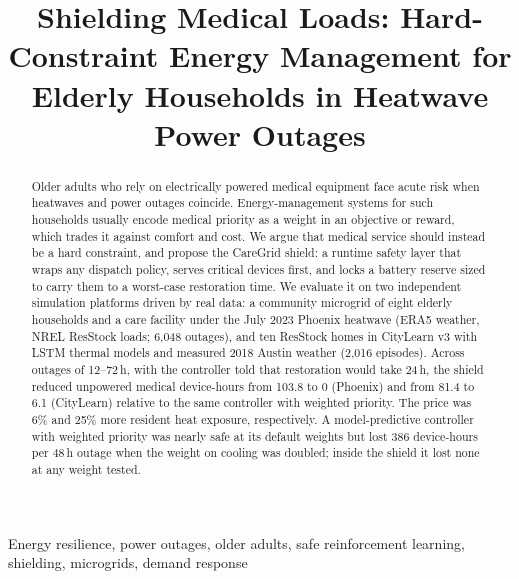 \documentclass[conference]{IEEEtran}
\begin{document}

\title{Shielding Medical Loads: Hard-Constraint Energy Management for Elderly Households in Heatwave Power Outages}

\author{
}

\maketitle

\begin{abstract}
Older adults who rely on electrically powered medical equipment face acute risk when heatwaves and power outages coincide. Energy-management systems for such households usually encode medical priority as a weight in an objective or reward, which trades it against comfort and cost. We argue that medical service should instead be a hard constraint, and propose the CareGrid shield: a runtime safety layer that wraps any dispatch policy, serves critical devices first, and locks a battery reserve sized to carry them to a worst-case restoration time. We evaluate it on two independent simulation platforms driven by real data: a community microgrid of eight elderly households and a care facility under the July 2023 Phoenix heatwave (ERA5 weather, NREL ResStock loads; 6,048 outages), and ten ResStock homes in CityLearn v3 with LSTM thermal models and measured 2018 Austin weather (2,016 episodes). Across outages of 12--72\,h, with the controller told that restoration would take 24\,h, the shield reduced unpowered medical device-hours from 103.8 to 0 (Phoenix) and from 81.4 to 6.1 (CityLearn) relative to the same controller with weighted priority. The price was 6\% and 25\% more resident heat exposure, respectively. A model-predictive controller with weighted priority was nearly safe at its default weights but lost 386 device-hours per 48\,h outage when the weight on cooling was doubled; inside the shield it lost none at any weight tested.
\end{abstract}

\begin{IEEEkeywords}
Energy resilience, power outages, older adults, safe reinforcement learning, shielding, microgrids, demand response
\end{IEEEkeywords}
\end{document}
